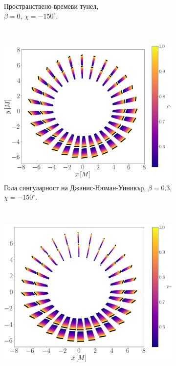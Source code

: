 \documentclass[12pt]{article}
\numberwithin{equation}{section}
\numberwithin{figure}{section}
\begin{document}
\begin{figure}[!htb]
\begin{subfigure}{7cm}
			\caption{Пространствено-времеви тунел, \\$\beta = 0$, $\chi = -150^\circ$.}
		\end{subfigure}\\
		\begin{subfigure}{7cm}
			\hspace{0.0em}
			\includegraphics[scale = 0.23]{Section_7_Polarized_Emission/JNW_alpha_Vert_Field.png}
			\caption{Гола сингуларност на Джанис-Нюман-Уиникър, $\beta = 0.3$, $\chi = -150^\circ$.} 
		\end{subfigure}\,\,\,
		\begin{subfigure}{7cm}
			\hspace{0.2em}
			\includegraphics[scale = 0.23]{Section_7_Polarized_Emission/JNW_alpha_Vert_Field_beta_zero.png}

\end{subfigure}
\end{figure}
\end{document}
